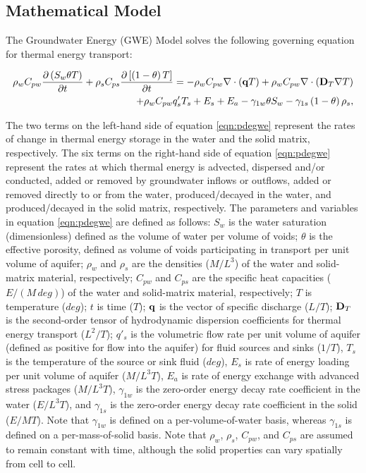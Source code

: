 \subsection{Mathematical Model} \label{sec:mathmodel}

The Groundwater Energy (GWE) Model solves the following governing equation for thermal energy transport:

\begin{equation}
\label{eqn:pdegwe}
\begin{aligned}
\rho_w C_{pw} \frac {\partial \left ( S_w \theta T \right )}{\partial t}
+ \rho_s C_{ps} \frac {\partial \left [ \left (1 - \theta \right ) T \right ]}{\partial t}
= - \rho_w C_{pw} \nabla \cdot \left ( \mathbf{q} T  \right ) 
+ \rho_w C_{pw} \nabla \cdot \left ( \mathbf{D}_T \nabla T \right )\\
+ \rho_w C_{pw} q'_s T_s + E_s + E_a - \gamma_{1w} \theta S_w
- \gamma_{1s} \left (1 - \theta \right ) \rho_s,
\end{aligned}
\end{equation}

\noindent The two terms on the left-hand side of equation \ref{eqn:pdegwe} represent the rates of change in thermal energy storage in the water and the solid matrix, respectively. The six terms on the right-hand side of equation \ref{eqn:pdegwe} represent the rates at which thermal energy is advected, dispersed and/or conducted, added or removed by groundwater inflows or outflows, added or removed directly to or from the water, produced/decayed in the water, and produced/decayed in the solid matrix, respectively. The parameters and variables in equation \ref{eqn:pdegwe} are defined as follows: $S_w$ is the water saturation (dimensionless) defined as the volume of water per volume of voids; $\theta$ is the effective porosity, defined as volume of voids participating in transport per unit volume of aquifer; $\rho_w$ and $\rho_s$ are the densities ($M/L^3$) of the water and solid-matrix material, respectively; $C_{pw}$ and $C_{ps}$ are the specific heat capacities ($E/(M \, deg)$) of the water and solid-matrix material, respectively; $T$ is temperature ($deg$); $t$ is time ($T$); $\mathbf{q}$ is the vector of specific discharge ($L/T$); $\mathbf{D}_T$ is the second-order tensor of hydrodynamic dispersion coefficients for thermal energy transport ($L^2/T$); $q'_s$ is the volumetric flow rate per unit volume of aquifer (defined as positive for flow into the aquifer) for fluid sources and sinks ($1/T$), $T_s$ is the temperature of the source or sink fluid ($deg$), $E_s$ is rate of energy loading per unit volume of aquifer ($M/L^3T$), $E_a$ is rate of energy exchange with advanced stress packages ($M/L^3T$), $\gamma_{1w}$ is the zero-order energy decay rate coefficient in the water ($E/L^3T$), and $\gamma_{1s}$ is the zero-order energy decay rate coefficient in the solid ($E/MT$). Note that $\gamma_{1w}$ is defined on a per-volume-of-water basis, whereas $\gamma_{1s}$ is defined on a per-mass-of-solid basis. Note that $\rho_w$, $\rho_s$, $C_{pw}$, and $C_{ps}$ are assumed to remain constant with time, although the solid properties can vary spatially from cell to cell.

